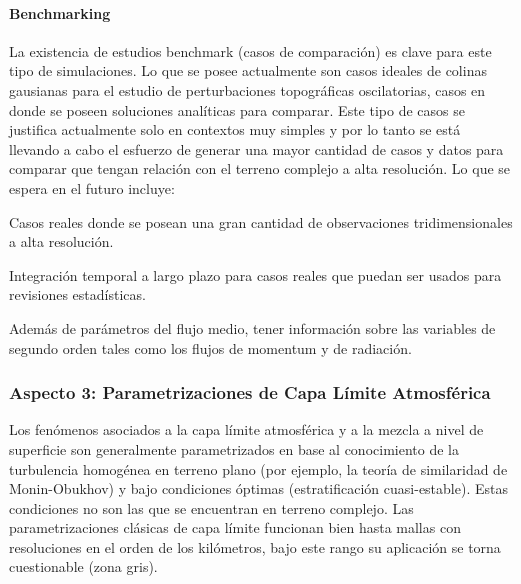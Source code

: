 \paragraph{Benchmarking} La existencia de estudios benchmark (casos de comparación) es clave para este tipo de simulaciones. Lo que se posee actualmente son casos ideales de colinas gausianas para el estudio de perturbaciones topográficas oscilatorias, casos en donde se poseen soluciones analíticas para comparar. Este tipo de casos se justifica actualmente solo en contextos muy simples y por lo tanto se está llevando a cabo el esfuerzo de generar una mayor cantidad de casos y datos para comparar que tengan relación con el terreno complejo a alta resolución. Lo que se espera en el futuro incluye:
\begin{itemize*}
	\item Casos reales donde se posean una gran cantidad de observaciones tridimensionales a alta resolución.
	\item Integración temporal a largo plazo para casos reales que puedan ser usados para revisiones estadísticas.
	\item Además de parámetros del flujo medio, tener información sobre las variables de segundo orden tales como los flujos de momentum y de radiación.
\end{itemize*} 
\subsubsection{Aspecto 3: Parametrizaciones de Capa Límite Atmosférica}
Los fenómenos asociados a la capa límite atmosférica y a la mezcla a nivel de superficie son generalmente parametrizados en base al conocimiento de la turbulencia homogénea en terreno plano (por ejemplo, la teoría de similaridad de Monin-Obukhov) y bajo condiciones óptimas (estratificación cuasi-estable). Estas condiciones no son las que se encuentran en terreno complejo. Las parametrizaciones clásicas de capa límite funcionan bien hasta mallas con resoluciones en el orden de los kilómetros, bajo este rango su aplicación se torna cuestionable (zona gris).

